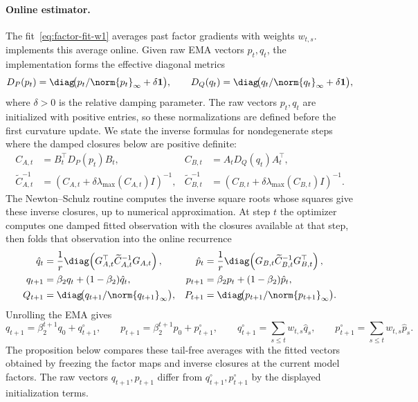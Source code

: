 \paragraph{Online estimator.} The fit~\eqref{eq:factor-fit-w1} averages past
factor gradients with weights $w_{t,s}$. \methodname{} implements this
average online. Given raw EMA vectors $p_t,q_t$, the implementation forms
the effective diagonal metrics
\[
  D_P(p_t)=\diag\!\bigl(p_t/\norm{p_t}_\infty+\delta\mathbf 1\bigr),
  \qquad
  D_Q(q_t)=\diag\!\bigl(q_t/\norm{q_t}_\infty+\delta\mathbf 1\bigr),
\]
where $\delta>0$ is the relative damping parameter. The raw vectors
$p_t,q_t$ are initialized with positive entries, so these normalizations are
defined before the first curvature update. We state the inverse formulas for
nondegenerate steps where the damped closures below are positive definite:
\[
\begin{aligned}
  C_{A,t}&=B_t^\top D_P(p_t)B_t,
  &
  C_{B,t}&=A_tD_Q(q_t)A_t^\top,\\
  \widetilde C_{A,t}^{-1}
  &=(C_{A,t}+\delta\lambda_{\max}(C_{A,t})I)^{-1},
  &
  \widetilde C_{B,t}^{-1}
  &=(C_{B,t}+\delta\lambda_{\max}(C_{B,t})I)^{-1}.
\end{aligned}
\]
The Newton--Schulz routine computes the inverse square roots whose squares
give these inverse closures, up to numerical approximation. At step $t$ the
optimizer computes one damped fitted observation with the closures available
at that step, then folds that observation into the online recurrence
\begin{equation}\label{eq:ours-klcoupling-w1}
\begin{aligned}
  \hat{q}_t &= \frac1r\diag\!\left(G_{A,t}^\top \widetilde C_{A,t}^{-1}G_{A,t}\right),
  &
  \hat{p}_t &= \frac1r\diag\!\left(G_{B,t} \widetilde C_{B,t}^{-1}G_{B,t}^\top\right),
  \\
  q_{t+1} &= \beta_2q_t+(1-\beta_2)\hat{q}_t,
  &
  p_{t+1} &= \beta_2p_t+(1-\beta_2)\hat{p}_t,
  \\
  Q_{t+1} &= \diag\!\bigl(q_{t+1}/\norm{q_{t+1}}_\infty\bigr),
  &
  P_{t+1} &= \diag\!\bigl(p_{t+1}/\norm{p_{t+1}}_\infty\bigr).
\end{aligned}
\end{equation}
Unrolling the EMA gives
\[
  q_{t+1}
  =
  \beta_2^{t+1}q_0+q^\circ_{t+1},
  \qquad
  p_{t+1}
  =
  \beta_2^{t+1}p_0+p^\circ_{t+1},
  \qquad
  q^\circ_{t+1}=\sum_{s\le t}w_{t,s}\hat q_s,
  \qquad
  p^\circ_{t+1}=\sum_{s\le t}w_{t,s}\hat p_s .
\]
The proposition below compares these tail-free averages with the fitted
vectors obtained by freezing the factor maps and inverse closures at the
current model factors. The raw vectors $q_{t+1},p_{t+1}$ differ from
$q^\circ_{t+1},p^\circ_{t+1}$ by the displayed initialization terms.

